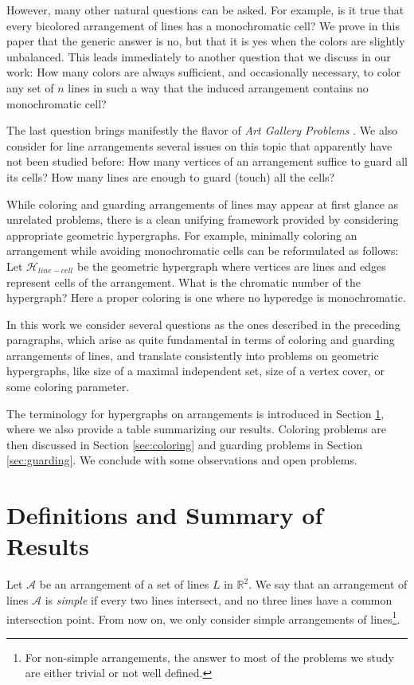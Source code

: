 \documentclass[11pt,a4paper]{article}
\newcommand{\Hlinecell}{{\mathcal H}_{line-cell}}
\begin{document}
However, many other natural questions can be asked. For example, is it true that every bicolored arrangement of lines has a monochromatic cell? We prove in this paper that the generic answer is no, but that it is yes when the colors are slightly unbalanced. This leads immediately to another question that we discuss in our work: How many colors are always sufficient, and occasionally necessary, to color any set of $n$ lines in such a way that the induced arrangement contains no monochromatic cell?

The last question brings manifestly the flavor of \emph{Art Gallery Problems} \cite{OR1,OR2,URR}. We also consider for line arrangements several issues on this topic that apparently have not been studied before: How many vertices of an arrangement suffice to guard all its cells? How many lines are enough to guard (touch) all the cells?

While coloring and guarding arrangements of lines may appear at first glance as unrelated problems, there is a clean unifying framework provided by considering appropriate geometric hypergraphs. For example, minimally coloring an arrangement while avoiding monochromatic cells can be reformulated as follows: Let $\Hlinecell$ be the geometric hypergraph where vertices are lines and edges represent cells of the arrangement. What is the chromatic number of the hypergraph? Here a proper coloring is one where no hyperedge is monochromatic.

In this work we consider several questions as the ones described in the preceding paragraphs, which arise as quite fundamental in terms of coloring and guarding arrangements of lines, and translate consistently into problems on geometric hypergraphs,  like size of a maximal independent set, size of a vertex cover, or some coloring parameter.

The terminology for hypergraphs on arrangements is introduced in Section \ref{sec:definitions}, where we also provide a table summarizing our results. Coloring problems are then discussed in Section \ref{sec:coloring} and guarding problems in Section \ref{sec:guarding}. We conclude with some observations and open problems.

\section{Definitions and Summary of Results}\label{sec:definitions}
Let $\mathcal{A}$ be an arrangement of a set of lines $L$ in $\mathbb{R}^2$. We say that an arrangement of lines $\mathcal{A}$ is {\em simple} if every two lines intersect, and no three lines have a common intersection point. From now on, we only consider simple arrangements of lines\footnote{For non-simple arrangements, the answer to most of the problems we study are either trivial or not well defined.}. 
\end{document}
